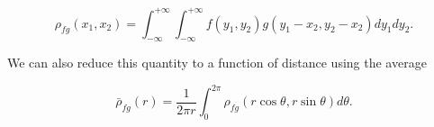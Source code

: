 \documentclass{article}
\begin{document}
\begin{equation}
  \rho_{fg}(x_1,x_2)=\int_{-\infty}^{+\infty}\int_{-\infty}^{+\infty}f(y_1,y_2)g(y_1-x_2,y_2-x_2)dy_1dy_2.
\end{equation}

We can also reduce this quantity to a function of distance using the
average

\begin{equation}
  \bar\rho_{fg}(r)=\frac{1}{2\pi r}\int_0^{2\pi}\rho_{fg}(r\cos\theta,r\sin\theta)d\theta.
\end{equation}



\end{document}

